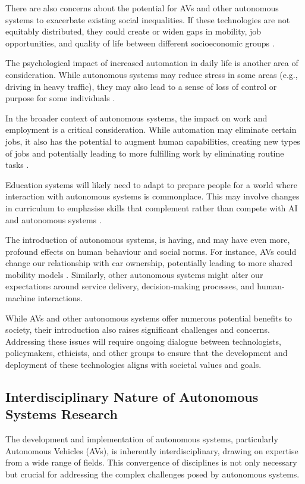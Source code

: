 There are also concerns about the potential for AVs and other autonomous systems to exacerbate existing social inequalities. If these technologies are not equitably distributed, they could create or widen gaps in mobility, job opportunities, and quality of life between different socioeconomic groups \cite{Milakis2017}.

The psychological impact of increased automation in daily life is another area of consideration. While autonomous systems may reduce stress in some areas (e.g., driving in heavy traffic), they may also lead to a sense of loss of control or purpose for some individuals \cite{Hancock2020}.

In the broader context of autonomous systems, the impact on work and employment is a critical consideration. While automation may eliminate certain jobs, it also has the potential to augment human capabilities, creating new types of jobs and potentially leading to more fulfilling work by eliminating routine tasks \cite{Autor2015}.

Education systems will likely need to adapt to prepare people for a world where interaction with autonomous systems is commonplace. This may involve changes in curriculum to emphasise skills that complement rather than compete with AI and autonomous systems \cite{Manyika2017}.

The introduction of autonomous systems, is having, and may have even more, profound effects on human behaviour and social norms. For instance, AVs could change our relationship with car ownership, potentially leading to more shared mobility models \cite{Fagnant2015}. Similarly, other autonomous systems might alter our expectations around service delivery, decision-making processes, and human-machine interactions.

While AVs and other autonomous systems offer numerous potential benefits to society, their introduction also raises significant challenges and concerns. Addressing these issues will require ongoing dialogue between technologists, policymakers, ethicists, and other groups to ensure that the development and deployment of these technologies aligns with societal values and goals.

\subsection{Interdisciplinary Nature of Autonomous Systems Research}

The development and implementation of autonomous systems, particularly Autonomous Vehicles (AVs), is inherently interdisciplinary, drawing on expertise from a wide range of fields. This convergence of disciplines is not only necessary but crucial for addressing the complex challenges posed by autonomous systems.

